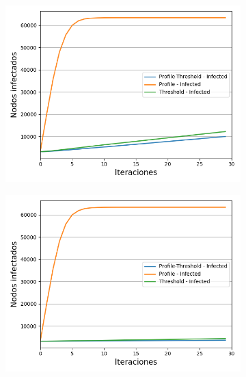 \documentclass{article}
\begin{document}
\begin{figure}[!tbp]
\begin{subfigure}[b]{0.5\textwidth}
		\caption{}
		\label{fig:f34}
	\end{subfigure}
	\hfil
	\begin{subfigure}[b]{0.5\textwidth}
		\includegraphics[width=\textwidth, height=\textwidth]{../Images/Fig 3 e).png}
		\caption{}
		\label{fig:f35}
	\end{subfigure}
	\hfill
	\begin{subfigure}[b]{0.5\textwidth}
		\includegraphics[width=\textwidth, height=\textwidth]{../Images/Fig 3 f).png}

\end{subfigure}
\end{figure}
\end{document}
